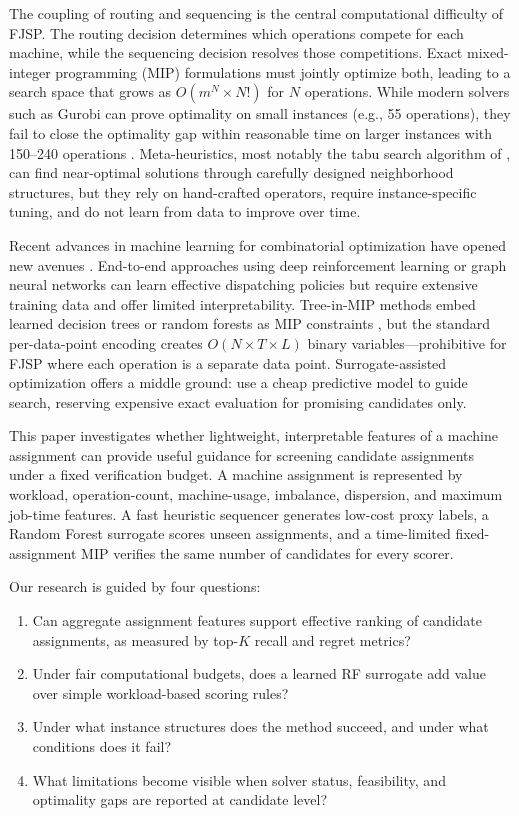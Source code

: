 \documentclass[12pt]{article}
\begin{document}
The coupling of routing and sequencing is the central computational difficulty of FJSP. The routing decision determines which operations compete for each machine, while the sequencing decision resolves those competitions. Exact mixed-integer programming (MIP) formulations must jointly optimize both, leading to a search space that grows as $O(m^{N} \times N!)$ for $N$ operations. While modern solvers such as Gurobi can prove optimality on small instances (e.g., 55 operations), they fail to close the optimality gap within reasonable time on larger instances with 150--240 operations \citep{Ozguven2010}. Meta-heuristics, most notably the tabu search algorithm of \citet{Mastrolilli2000}, can find near-optimal solutions through carefully designed neighborhood structures, but they rely on hand-crafted operators, require instance-specific tuning, and do not learn from data to improve over time.

Recent advances in machine learning for combinatorial optimization have opened new avenues \citep{Bengio2021}. End-to-end approaches using deep reinforcement learning or graph neural networks can learn effective dispatching policies \citep{Zhang2020drl,Song2023} but require extensive training data and offer limited interpretability. Tree-in-MIP methods embed learned decision trees or random forests as MIP constraints \citep{Maragno2023}, but the standard per-data-point encoding creates $O(N \times T \times L)$ binary variables---prohibitive for FJSP where each operation is a separate data point. Surrogate-assisted optimization \citep{Jin2011} offers a middle ground: use a cheap predictive model to guide search, reserving expensive exact evaluation for promising candidates only.

This paper investigates whether lightweight, interpretable features of a machine assignment can provide useful guidance for screening candidate assignments under a fixed verification budget. A machine assignment is represented by workload, operation-count, machine-usage, imbalance, dispersion, and maximum job-time features. A fast heuristic sequencer generates low-cost proxy labels, a Random Forest surrogate scores unseen assignments, and a time-limited fixed-assignment MIP verifies the same number of candidates for every scorer.

Our research is guided by four questions:
\begin{enumerate}[leftmargin=1.2em]
    \item[\textbf{RQ1.}] Can aggregate assignment features support effective ranking of candidate assignments, as measured by top-$K$ recall and regret metrics?
    \item[\textbf{RQ2.}] Under fair computational budgets, does a learned RF surrogate add value over simple workload-based scoring rules?
    \item[\textbf{RQ3.}] Under what instance structures does the method succeed, and under what conditions does it fail?
    \item[\textbf{RQ4.}] What limitations become visible when solver status, feasibility, and optimality gaps are reported at candidate level?
\end{enumerate}
\end{document}
